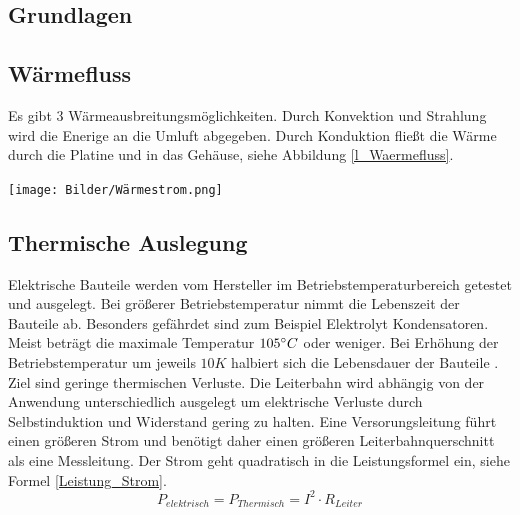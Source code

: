 \documentclass[10pt,a4paper,oneside,abstracton]{scrartcl}
\newenvironment{Figure}
  {\par\medskip\noindent\minipage{\linewidth}}
  {\endminipage\par\medskip}
\begin{document}
\begin{multicols}{2}
\section{Grundlagen}

\subsection{Wärmefluss}
Es gibt 3 Wärmeausbreitungsmöglichkeiten.  
Durch Konvektion und Strahlung wird die Enerige an die Umluft abgegeben.
Durch Konduktion fließt die Wärme durch die Platine und in das Gehäuse, siehe Abbildung \ref*{l_Waermefluss}.

\begin{Figure}
	\texttt{[image: Bilder/Wärmestrom.png]}
	\label{l_Waermefluss}
\end{Figure}

\subsection{Thermische Auslegung}
Elektrische Bauteile werden vom Hersteller im Betriebstemperaturbereich getestet und ausgelegt. 
Bei größerer Betriebstemperatur nimmt die Lebenszeit der Bauteile ab. 
\newline
Besonders gefährdet sind zum Beispiel Elektrolyt Kondensatoren. 
Meist beträgt die maximale Temperatur $ 105 \degree C $ oder weniger. \newline 
Bei Erhöhung der Betriebstemperatur um jeweils $ 10K $ halbiert sich die Lebensdauer der Bauteile \cite{Elko}.
\newline
Ziel sind geringe thermischen Verluste. 
\newline
Die Leiterbahn wird abhängig von der Anwendung unterschiedlich ausgelegt um 
elektrische Verluste durch Selbstinduktion und Widerstand gering zu halten. 
\newline
Eine Versorungsleitung führt einen größeren Strom und benötigt daher einen größeren Leiterbahnquerschnitt als eine Messleitung.
Der Strom geht quadratisch in die Leistungsformel ein, siehe Formel \ref*{Leistung_Strom}. 
\begin{equation}
	P_{elektrisch} = P_{Thermisch} =  I^2 \cdot R_{Leiter} 
	\label{Leistung_Strom}
\end{equation}


\end{multicols}
\end{document}
